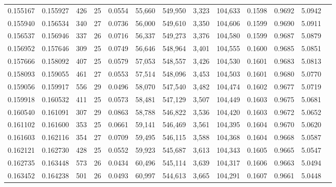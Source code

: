 \begin{tabular}{rrrrrrrrrrrrr}
0.155167 & 0.155927 &   426 &  25 &                                     0.0554 &  55,660 & 549,950 &   3,323 & 104,633 & 0.1598 & 0.9692 & 5.0942 \\
0.155940 & 0.156534 &   340 &  27 &                                     0.0736 &  56,000 & 549,610 &   3,350 & 104,606 & 0.1599 & 0.9690 & 5.0911 \\
0.156537 & 0.156946 &   337 &  26 &                                     0.0716 &  56,337 & 549,273 &   3,376 & 104,580 & 0.1599 & 0.9687 & 5.0879 \\
0.156952 & 0.157646 &   309 &  25 &                                     0.0749 &  56,646 & 548,964 &   3,401 & 104,555 & 0.1600 & 0.9685 & 5.0851 \\
0.157666 & 0.158092 &   407 &  25 &                                     0.0579 &  57,053 & 548,557 &   3,426 & 104,530 & 0.1601 & 0.9683 & 5.0813 \\
0.158093 & 0.159055 &   461 &  27 &                                     0.0553 &  57,514 & 548,096 &   3,453 & 104,503 & 0.1601 & 0.9680 & 5.0770 \\
0.159056 & 0.159917 &   556 &  29 &                                     0.0496 &  58,070 & 547,540 &   3,482 & 104,474 & 0.1602 & 0.9677 & 5.0719 \\
0.159918 & 0.160532 &   411 &  25 &                                     0.0573 &  58,481 & 547,129 &   3,507 & 104,449 & 0.1603 & 0.9675 & 5.0681 \\
0.160540 & 0.161091 &   307 &  29 &                                     0.0863 &  58,788 & 546,822 &   3,536 & 104,420 & 0.1603 & 0.9672 & 5.0652 \\
0.161102 & 0.161600 &   353 &  25 &                                     0.0661 &  59,141 & 546,469 &   3,561 & 104,395 & 0.1604 & 0.9670 & 5.0620 \\
0.161603 & 0.162116 &   354 &  27 &                                     0.0709 &  59,495 & 546,115 &   3,588 & 104,368 & 0.1604 & 0.9668 & 5.0587 \\
0.162121 & 0.162730 &   428 &  25 &                                     0.0552 &  59,923 & 545,687 &   3,613 & 104,343 & 0.1605 & 0.9665 & 5.0547 \\
0.162735 & 0.163448 &   573 &  26 &                                     0.0434 &  60,496 & 545,114 &   3,639 & 104,317 & 0.1606 & 0.9663 & 5.0494 \\
0.163452 & 0.164238 &   501 &  26 &                                     0.0493 &  60,997 & 544,613 &   3,665 & 104,291 & 0.1607 & 0.9661 & 5.0448 \\

\end{tabular}
